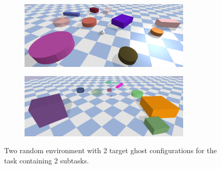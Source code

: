 \begin{figure}[H]
    \centering
    \begin{subfigure}{\textwidth}
    \centering
    \includegraphics[width=0.9\textwidth]{figures/tests/random_1}
    \end{subfigure}

    \vspace{0.2cm}
    \begin{subfigure}{\textwidth}
    \centering
    \includegraphics[width=0.9\textwidth]{figures/tests/random_2}
    \end{subfigure}
    \caption{Two random environment with 2 target ghost configurations for the task containing 2 subtasks.}%
    \label{fig:random_environnment}
\end{figure}


